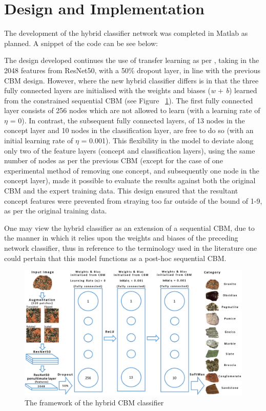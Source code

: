 \section{Design and Implementation}

The development of the hybrid classifier network was completed in Matlab as planned. A snippet of the code can be see below:



The design developed continues the use of transfer learning as per \cite{grangeXAISelfexplanatoryAI2022}, taking in the 2048 features from ResNet50, with a 50\% dropout layer, in line with the previous CBM design. However, where the new hybrid classifier differs is in that the three fully connected layers are initialised with the weights and biases (\emph{w} + \emph{b}) learned from the constrained sequential CBM (see Figure ~\ref{fig:Hybrid classifier XAI&I}). The first fully connected layer consists of 256 nodes which are not allowed to learn (with a learning rate of $\eta$ = 0). In contrast, the subsequent fully connected layers, of 13 nodes in the concept layer and 10 nodes in the classification layer, are free to do so (with an initial learning rate of $\eta$ = 0.001). This flexibility in the model to deviate along only two of the feature layers (concept and classification layers), using the same number of nodes as per the previous CBM (except for the case of one experimental method of removing one concept, and subsequently one node in the concept layer), made it possible to evaluate the results against both the original CBM and the expert training data. This design ensured that the resultant concept features were prevented from straying too far outside of the bound of 1-9, as per the original training data.

One may view the hybrid classifier as an extension of a sequential CBM, due to the manner in which it relies upon the weights and biases of the preceding network classifier, thus in reference to the terminology used in the literature one could pertain that this model functions as a post-hoc sequential CBM.

\begin{figure}[H]
  \centering
    \includegraphics[width=\textwidth]{images/Hybrid Network Figure V2.png}
    \caption{The framework of the hybrid CBM classifier} \label{fig:Hybrid classifier XAI&I}
\end{figure}


